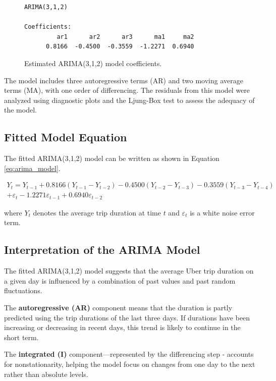 \documentclass{article}
\begin{document}
\begin{figure}[ht]
\centering
\label{fig:arima_coefficients}
\begin{lstlisting}[basicstyle=\ttfamily]
ARIMA(3,1,2)

Coefficients:
         ar1      ar2      ar3      ma1     ma2
      0.8166  -0.4500  -0.3559  -1.2271  0.6940
\end{lstlisting}
\caption{Estimated ARIMA(3,1,2) model coefficients.}
\end{figure}

The model includes three autoregressive terms (AR) and two moving average terms (MA), with one order of differencing. The residuals from this model were analyzed using diagnostic plots and the Ljung-Box test to assess the adequacy of the model.

\subsection{Fitted Model Equation}

The fitted ARIMA(3,1,2) model can be written as shown in Equation \ref{eq:arima_model}.

\begin{multline}
\label{eq:arima_model}
Y_t = Y_{t-1} 
+ 0.8166 (Y_{t-1} - Y_{t-2}) 
- 0.4500 (Y_{t-2} - Y_{t-3}) 
- 0.3559 (Y_{t-3} - Y_{t-4}) \\
+ \varepsilon_t 
- 1.2271 \varepsilon_{t-1} 
+ 0.6940 \varepsilon_{t-2}
\end{multline}

where \( Y_t \) denotes the average trip duration at time \( t \) and \( \varepsilon_t \) is a white noise error term.

\subsection{Interpretation of the ARIMA Model}

The fitted ARIMA(3,1,2) model suggests that the average Uber trip duration on a given day is influenced by a combination of past values and past random fluctuations. 

The \textbf{autoregressive (AR)} component means that the duration is partly predicted using the trip durations of the last three days. If durations have been increasing or decreasing in recent days, this trend is likely to continue in the short term. 

The \textbf{integrated (I)} component—represented by the differencing step - accounts for nonstationarity, helping the model focus on changes from one day to the next rather than absolute levels.
\end{document}
